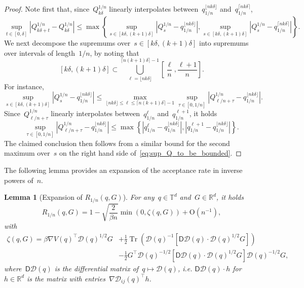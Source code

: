 \documentclass{article}
\newtheorem{lemma}{Lemma}
\newcommand{\R}{\mathbb{R}}
\renewcommand{\leq}{\leqslant}
\def\R{\mathbb{R}}
\newcommand{\Diff}{\mathcal{D}}
\renewcommand{\dim}{d}
\begin{document}
\begin{proof}
  Note first that, since~$Q^{1/n}_{k\delta}$ linearly interpolates between~$q_{1/n}^{\lfloor nk\delta \rfloor}$ and~$q_{1/n}^{\lceil nk\delta \rceil}$, 
  \begin{equation}
    \label{eq:sup_Q_to_be_bounded}
  \sup_{t\in[0,\delta]} \left|Q^{1/n}_{k\delta +t}-Q^{1/n}_{k\delta}\right| \leq \max \left\{ \sup_{s\in[k\delta,(k+1)\delta]} \left|Q^{1/n}_{s}-q_{1/n}^{\lfloor nk\delta \rfloor}\right|, \sup_{s\in[k\delta,(k+1)\delta]} \left|Q^{1/n}_{s}-q_{1/n}^{\lceil nk\delta \rceil}\right|\right\}.
  \end{equation}
  We next decompose the supremums over~$s \in [k\delta,(k+1)\delta]$ into supremums over intervals of length~$1/n$, by noting that
  \[
  [k\delta,(k+1)\delta] \subset \bigcup_{\ell = \lfloor nk\delta \rfloor}^{\lceil n(k+1)\delta \rceil-1} \left[ \frac{\ell}{n},\frac{\ell+1}{n}\right].
  \]
  For instance,
  \[
  \sup_{s\in[k\delta,(k+1)\delta]} \left|Q^{1/n}_{s}-q_{1/n}^{\lfloor nk\delta \rfloor}\right| \leq \max_{\lfloor nk\delta \rfloor \leq \ell\leq \lceil n(k+1)\delta \rceil-1} \sup_{\tau\in[0,1/n]} \left|Q^{1/n}_{\ell/n+\tau}-q_{1/n}^{\lfloor nk\delta \rfloor}\right|.
  \]
  Since~$Q^{1/n}_{\ell/n+\tau}$ linearly interpolates between~$q_{1/n}^\ell$ and~$q_{1/n}^{\ell+1}$, it holds
  \[
  \sup_{\tau\in[0,1/n]} \left|Q^{1/n}_{\ell/n+\tau}-q_{1/n}^{\lfloor nk\delta \rfloor}\right| \leq \max \left\{ \left|q_{1/n}^\ell-q_{1/n}^{\lfloor nk\delta \rfloor}\right|, \left|q_{1/n}^{\ell+1}-q_{1/n}^{\lfloor nk\delta \rfloor}\right|\right\}. 
  \]
  The claimed conclusion then follows from a similar bound for the second maximum over~$s$ on the right hand side of~\eqref{eq:sup_Q_to_be_bounded}.
\end{proof}

The following lemma provides an expansion of the acceptance rate in inverse powers of~$n$. 

\begin{lemma}[Expansion of $R_{1/n}(q, G)$]
  \label{lem:acceptance-rate-DL}
  For any~$q \in \mathbb{T}^\dim$ and~$G \in \mathbb{R}^\dim$, it holds
  \[
  R_{1/n}(q, G) = 1-\sqrt{\frac{2}{\beta n}}\min(0,\zeta(q, G) ) + \mathrm{O}(n^{-1}),
  \]
  with
  \begin{equation}
    \label{eq:zeta-def}
    \begin{aligned}
      \zeta(q, G) = \beta\nabla V(q)^{\top}\Diff(q)^{1/2}G & + \frac{1}{2}\operatorname{Tr}\left(\Diff(q)^{-1}\left[\textsf{D}\Diff(q)\cdot\Diff(q)^{1/2}G\right]\right) \\
      & -\frac{1}{2}G^{\top}\Diff(q)^{-1/2}\left[\textsf{D}\Diff(q)\cdot\Diff(q)^{1/2}G\right]\Diff(q)^{-1/2}G,
    \end{aligned}
  \end{equation}
  where~$\textsf{D}\Diff(q)$ is the differential matrix of~$q\mapsto\Diff(q)$, \emph{i.e.} $\textsf{D}\Diff(q) \cdot h$ for~$h \in \R^\dim$ is the matrix with entries~$\nabla \Diff_{ij}(q)^\top h$. 
\end{lemma}
\end{document}
